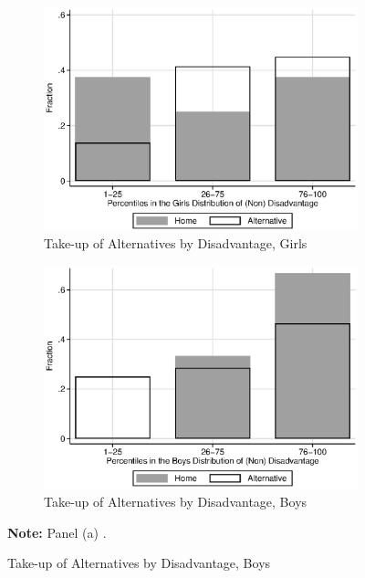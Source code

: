 \begin{figure}
\begin{subfigure}[h]{0.45\textwidth}
	\centering
	\caption{Take-up of Alternatives by Disadvantage, Girls} 
	\includegraphics[width=\textwidth]{output/factorbase_wgirlscompare}
\end{subfigure}%
\begin{subfigure}[h]{0.45\textwidth}
	\centering
	\caption{Take-up of Alternatives by Disadvantage, Boys} 
	\includegraphics[width=\textwidth]{output/factorbase_wboyscompare}
\end{subfigure}
\footnotesize
\justify
\textbf{Note:} Panel (a) .
\end{figure}








